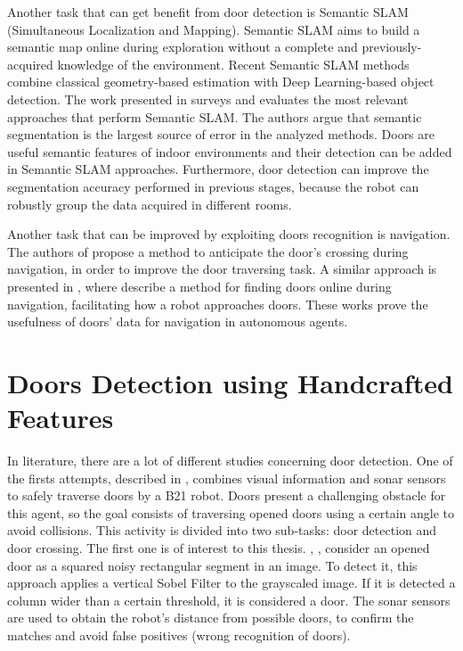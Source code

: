  Another task that can get benefit from door detection is Semantic SLAM (Simultaneous Localization and Mapping). Semantic SLAM aims to build a semantic map online during exploration without a complete and previously-acquired knowledge of the environment. Recent Semantic SLAM methods combine classical geometry-based estimation with Deep Learning-based object detection. The work presented in \cite{semanticslamsurvey} surveys and evaluates the most relevant approaches that perform Semantic SLAM. The authors argue that semantic segmentation is the largest source of error in the analyzed methods. Doors are useful semantic features of indoor environments and their detection can be added in Semantic SLAM approaches. Furthermore, door detection can improve the segmentation accuracy performed in previous stages, because the robot can robustly group the data acquired in different rooms. 
 
 Another task that can be improved by exploiting doors recognition is navigation. The authors of \cite{sonarandivisualdoordetection} propose a method to anticipate the door's crossing during navigation, in order to improve the door traversing task. A similar approach is presented in \cite{doorsandnavigation}, where \citeauthor{doorsandnavigation} describe a method for finding doors online during navigation, facilitating how a robot approaches doors. These works prove the usefulness of doors' data for navigation in autonomous agents.
 
 \section{Doors Detection using Handcrafted Features}
  In literature, there are a lot of different studies concerning door detection. One of the firsts attempts, described in \cite{sonarandivisualdoordetection}, combines visual information and sonar sensors to safely traverse doors by a B21 robot. Doors present a challenging obstacle for this agent, so the goal consists of traversing opened doors using a certain angle to avoid collisions. This activity is divided into two sub-tasks: door detection and door crossing. The first one is of interest to this thesis. \citeauthor{sonarandivisualdoordetection}, \cite{sonarandivisualdoordetection}, consider an opened door as a squared noisy rectangular segment in an image. To detect it, this approach applies a vertical Sobel Filter to the grayscaled image. If it is detected a column wider than a certain threshold, it is considered a door. The sonar sensors are used to obtain the robot's distance from possible doors, to confirm the matches and avoid false positives (wrong recognition of doors).
  

